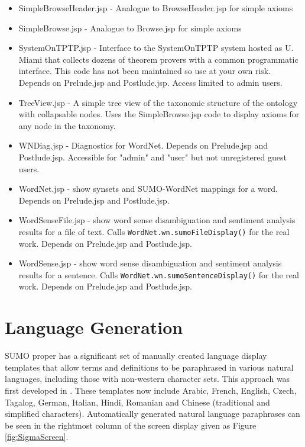 \documentclass{book}
\begin{document}
\begin{itemize}
\item SimpleBrowseHeader.jsp - Analogue to BrowseHeader.jsp for simple axioms

\item SimpleBrowse.jsp - Analogue to Browse.jsp for simple axioms

\item SystemOnTPTP.jsp - Interface to the SystemOnTPTP system hosted as U. Miami that collects
dozens of theorem provers with a common programmatic interface.  This code has not been
maintained so use at your own risk. Depends on Prelude.jsp and Postlude.jsp. Access
limited to admin users.

\item TreeView.jsp - A simple tree view of the taxonomic structure of the ontology with collapsable
nodes.  Uses the SimpleBrowse.jsp code to display axioms for any node in the taxonomy.

\item WNDiag.jsp - Diagnostics for WordNet. Depends on Prelude.jsp and Postlude.jsp. Accessible
for "admin" and "user" but not unregistered guest users.

\item WordNet.jsp - show synsets and SUMO-WordNet mappings for a word. Depends on Prelude.jsp
and Postlude.jsp.

\item WordSenseFile.jsp - show word sense disambiguation and sentiment analysis results for a
file of text.  Calls \texttt{WordNet.wn.sumoFileDisplay()} for the real work. Depends on
Prelude.jsp and Postlude.jsp.

\item WordSense.jsp - show word sense disambiguation and sentiment analysis results for a
sentence.  Calls \texttt{WordNet.wn.sumoSentenceDisplay()} for the real work. Depends on
Prelude.jsp and Postlude.jsp.

\end{itemize}

\section{Language Generation}
\label{chap:KnowEngi:sec:LangGene}

SUMO proper has a significant set of manually created language display templates
that allow terms and definitions to be paraphrased in various natural languages,
including those with non-western character sets.  This approach was first
developed in \cite{DBLP:conf/kes/Sevcenko03}. These templates now include
Arabic, French, English, Czech, Tagalog, German, Italian, Hindi, Romanian and
Chinese (traditional and simplified characters). Automatically generated natural
language paraphrases can be seen in the rightmost column of the screen display
given as Figure \ref{fig:SigmaScreen}.
\end{document}
